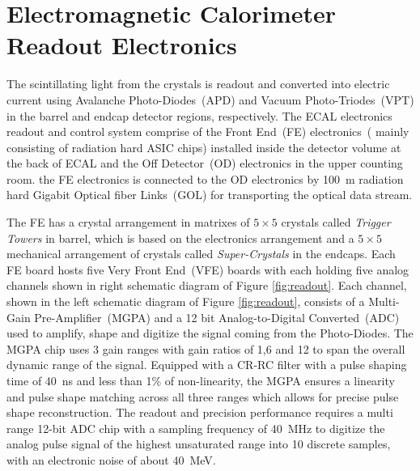 \section{Electromagnetic Calorimeter Readout Electronics}
The scintillating light from the \pb crystals is readout and converted into electric current using Avalanche Photo-Diodes~(APD) and Vacuum Photo-Triodes~(VPT) in the barrel and endcap detector regions, respectively. %
\newline
The ECAL electronics readout and control system comprise of the Front End~(FE) electronics~( mainly consisting of radiation hard ASIC chips) installed inside the detector volume at the back of ECAL and the Off Detector~(OD) electronics in the upper counting room. the FE electronics is connected to the OD electronics by 100~m radiation hard Gigabit Optical fiber Links~(GOL) for transporting the optical data stream. 
\par
The FE has a crystal arrangement in matrixes of $5\times5$ crystals called \textit{Trigger Towers} in barrel, which is  based on the electronics arrangement and a  $5\times5$ mechanical arrangement of crystals called \textit{Super-Crystals} in the endcaps. Each FE board hosts five Very Front End~(VFE) boards with each holding five analog channels shown in right schematic diagram of Figure \ref{fig:readout}. Each channel, shown in the left schematic diagram of Figure \ref{fig:readout}, consists of a Multi-Gain Pre-Amplifier~(MGPA) and a 12 bit Analog-to-Digital Converted~(ADC) used to amplify, shape and digitize the signal coming from the Photo-Diodes.
\newline
The MGPA chip uses 3 gain ranges with gain ratios of 1,6 and 12 to span the overall dynamic range of the signal. Equipped with a CR-RC filter  with a pulse shaping time of 40~ns and less than 1\% of non-linearity, the MGPA ensures a linearity and pulse shape matching across all three ranges which allows for precise pulse shape reconstruction.
\newline
The readout and precision performance requires a multi range 12-bit ADC chip with a sampling frequency of 40~MHz to digitize the analog pulse signal of the highest unsaturated range into 10 discrete samples, with an electronic noise  of about 40~MeV.
